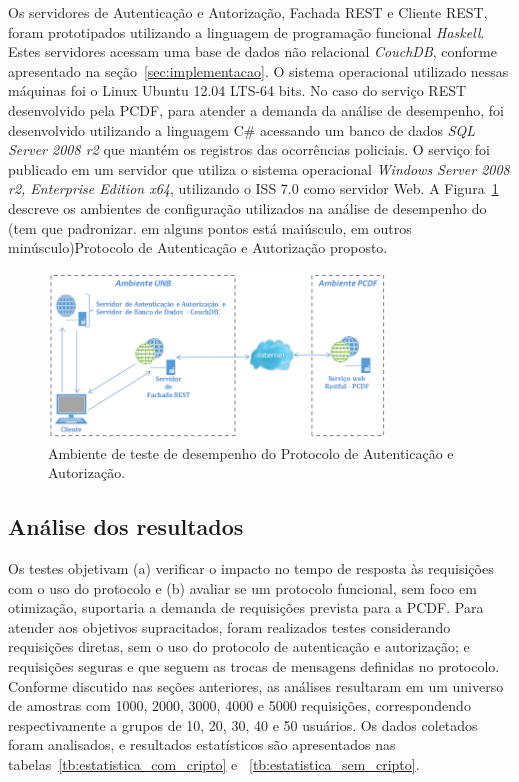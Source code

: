 Os servidores de Autenticação e Autorização, Fachada REST e Cliente REST, foram prototipados utilizando a linguagem de programação funcional \emph{Haskell}. Estes 
servidores acessam uma base de dados não relacional \emph{CouchDB}, conforme apresentado na seção~\ref{sec:implementacao}. 
O sistema operacional utilizado nessas máquinas foi o Linux Ubuntu 12.04 LTS-64 bits. No caso do serviço REST desenvolvido pela PCDF, 
para atender a demanda da análise de desempenho, foi desenvolvido utilizando a linguagem C\# acessando um banco de dados \emph{SQL Server 2008 r2} 
que mant\'{e}m os registros das ocorr\^{e}ncias policiais. O serviço foi publicado em um servidor que utiliza o sistema operacional 
\emph{Windows Server 2008 r2, Enterprise Edition x64}, utilizando o ISS 7.0 como servidor Web. 
A Figura~\ref{fig:ambiente_teste} descreve os ambientes de configuração utilizados na análise de desempenho do {\color{red}(tem que padronizar. em 
alguns pontos est\'{a} mai\'{u}sculo, em outros min\'{u}sculo)Protocolo de Autenticação e Autorização proposto}.


\begin{figure}[!htb]
\centering
\includegraphics[width=0.8\textwidth]{ambiente_teste_desempenho.png}
\caption{Ambiente de teste de desempenho do Protocolo de Autenticação e Autorização.}
\label{fig:ambiente_teste}
\end{figure}

\subsection{Análise dos resultados}

Os testes objetivam (a) verificar o impacto no tempo de resposta às requisições com o uso do protocolo e (b) avaliar se um protocolo funcional, sem foco em otimização, 
suportaria a demanda de requisi\c c\~{o}es prevista para a PCDF. Para atender aos objetivos supracitados, foram realizados testes considerando 
requisi\c c\~{o}es diretas, sem o uso do protocolo de autentica\c c\~{a}o e autoriza\c c\~{a}o; e requisi\c c\~{o}es seguras e que seguem as trocas 
de mensagens definidas no protocolo. Conforme discutido nas se\c c\~{o}es anteriores, as an\'{a}lises resultaram em um universo de amostras
com 1000, 2000, 3000, 4000 e 5000 requisi\c c\~{o}es, correspondendo respectivamente a grupos de 10, 20, 30, 40 e 50 usuários. 
Os dados coletados foram analisados, e resultados estatísticos são apresentados nas  tabelas~\ref{tb:estatistica_com_cripto} e ~\ref{tb:estatistica_sem_cripto}. 

